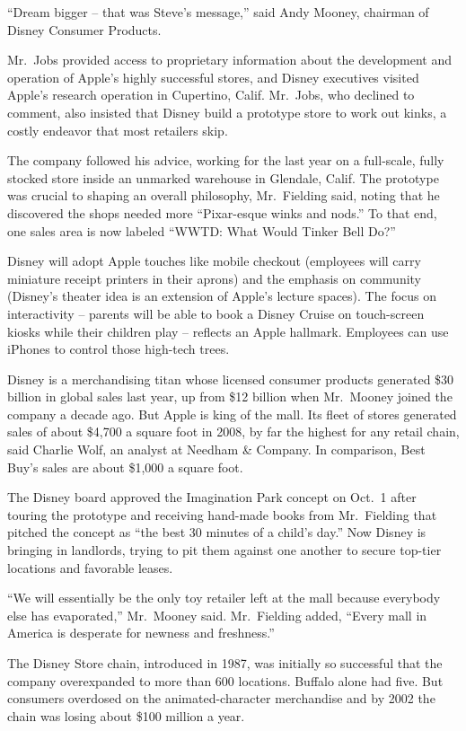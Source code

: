 ﻿\documentclass[12pt]{article}
\begin{document}
``Dream bigger -- that was Steve's message,'' said Andy Mooney, chairman of Disney Consumer
Products.

Mr.~Jobs provided access to proprietary information about the development and operation of Apple's
highly successful stores, and Disney executives visited Apple's research operation in Cupertino,
Calif. Mr.~Jobs, who declined to comment, also insisted that Disney build a prototype store to work
out kinks, a costly endeavor that most retailers skip.

The company followed his advice, working for the last year on a full-scale, fully stocked store
inside an unmarked warehouse in Glendale, Calif. The prototype was crucial to shaping an overall
philosophy, Mr.~Fielding said, noting that he discovered the shops needed more ``Pixar-esque winks
and nods.'' To that end, one sales area is now labeled ``WWTD: What Would Tinker Bell Do?''

Disney will adopt Apple touches like mobile checkout (employees will carry miniature receipt
printers in their aprons) and the emphasis on community (Disney's theater idea is an extension of
Apple's lecture spaces). The focus on interactivity -- parents will be able to book a Disney Cruise
on touch-screen kiosks while their children play -- reflects an Apple hallmark. Employees can use
iPhones to control those high-tech trees.

Disney is a merchandising titan whose licensed consumer products generated \$30 billion in global
sales last year, up from \$12 billion when Mr.~Mooney joined the company a decade ago. But Apple is
king of the mall. Its fleet of stores generated sales of about \$4,700 a square foot in 2008, by far
the highest for any retail chain, said Charlie Wolf, an analyst at Needham \& Company. In
comparison, Best Buy's sales are about \$1,000 a square foot.

The Disney board approved the Imagination Park concept on Oct.~1 after touring the prototype and
receiving hand-made books from Mr.~Fielding that pitched the concept as ``the best 30 minutes of a
child's day.'' Now Disney is bringing in landlords, trying to pit them against one another to secure
top-tier locations and favorable leases.

``We will essentially be the only toy retailer left at the mall because everybody else has
evaporated\cite{evaporate},'' Mr.~Mooney said. Mr.~Fielding added, ``Every mall in America is
desperate for newness and freshness.''

The Disney Store chain, introduced in 1987, was initially so successful that the company
overexpanded to more than 600 locations. Buffalo alone had five. But consumers overdosed on the
animated-character merchandise and by 2002 the chain was losing about \$100 million a year.
\end{document}
